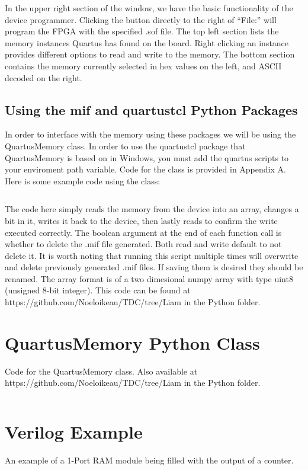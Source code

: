 \documentclass[letter,12pt]{article}
\begin{document}
In the upper right section of the window, we have the basic functionality of the device programmer. Clicking the button directly to the right of ``File:'' will program the FPGA with the specified .sof file. The top left section lists the memory instances Quartus has found on the board. Right clicking an instance provides different options to read and write to the memory. The bottom section contains the memory currently selected in hex values on the left, and ASCII decoded on the right.

\subsection{Using the mif and quartustcl Python Packages}

In order to interface with the memory using these packages we will be using the QuartusMemory class. In order to use the quartustcl package that QuartusMemory is based on in Windows, you must add the quartus scripts to your enviroment path variable. Code for the class is provided in Appendix A. Here is some example code using the class:

\begin{mdframed}
\inputminted[linenos=true,breaklines,breakanywhere=true]{python}{../../Python/memoryExample.py}
\end{mdframed}

The code here simply reads the memory from the device into an array, changes a bit in it, writes it back to the device, then lastly reads to confirm the write executed correctly. The boolean argument at the end of each function call is whether to delete the .mif file generated. Both read and write default to not delete it. It is worth noting that running this script multiple times will overwrite and delete previously generated .mif files. If saving them is desired they should be renamed. The array format is of a two dimesional numpy array with type uint8 (unsigned 8-bit integer). 
This code can be found at https://github.com/Noeloikeau/TDC/tree/Liam in the Python folder.

\newpage
\appendix

\section{QuartusMemory Python Class}

Code for the QuartusMemory class. Also available at \\ https://github.com/Noeloikeau/TDC/tree/Liam in the Python folder.

\begin{mdframed}
\inputminted[linenos=true,breaklines,breakanywhere=true]{python}{../../Python/QuartusMemory.py}
\end{mdframed}

\section{Verilog Example}
An example of a 1-Port RAM module being filled with the output of a counter.

\begin{mdframed}
\inputminted[linenos=true,breaklines,breakanywhere=true]{verilog}{memExample.v}
\end{mdframed}
\end{document}
